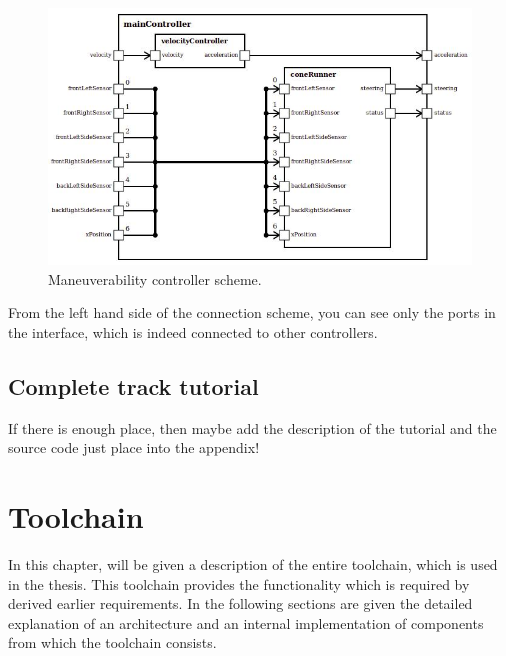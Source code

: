 \begin{figure}[ht]
    \centering
    \includegraphics[width=\linewidth]{src/pic/controller04}
    \caption{Maneuverability controller scheme.}
    \label{fig:maneuverability-scheme}
\end{figure}
From the left hand side of the connection scheme, you can see only the ports in the interface, which is indeed connected to other controllers.
\section{Complete track tutorial}
If there is enough place, then maybe add the description of the tutorial and the source code just place into the appendix! 
\chapter{Toolchain}
In this chapter, will be given a description of the entire toolchain, which is used in the thesis. This toolchain provides the functionality which is required by derived earlier requirements. In the following sections are given the detailed explanation of an architecture and an internal implementation of components from which the toolchain consists.
